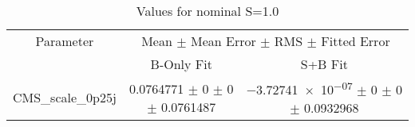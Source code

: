 \begin{table}
\centering
\caption{Values for nominal S=1.0}
\begin{tabular}{ccc}
\toprule
Parameter 	& \multicolumn{2}{c}{Mean $\pm$ Mean Error $\pm$ RMS $\pm$ Fitted Error}\\
 	& B-Only Fit & S+B Fit\\
\midrule
CMS\_scale\_0p25j 	& \num{0.0764771} $\pm$ \num{0} $\pm$ \num{0} $\pm$ \num{0.0761487} 	& \num{-3.72741e-07} $\pm$ \num{0} $\pm$ \num{0} $\pm$ \num{0.0932968}\\
\bottomrule
\end{tabular}
\end{table}
